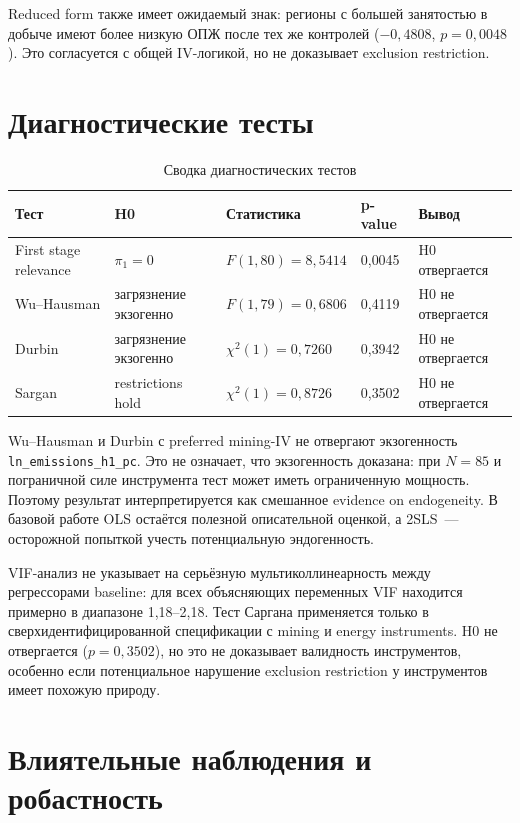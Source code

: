\documentclass[10pt,a4paper]{article}
\begin{document}
Reduced form также имеет ожидаемый знак: регионы с большей занятостью в добыче имеют более низкую ОПЖ после тех же контролей ($-0{,}4808$, $p=0{,}0048$). Это согласуется с общей IV-логикой, но не доказывает exclusion restriction.

\section{Диагностические тесты}

\begin{table}[H]
\centering
\caption{Сводка диагностических тестов}
\label{tab:tests}
\small
\setlength{\tabcolsep}{3pt}
\begin{tabular}{p{}p{}p{}p{}p{}}
\toprule
\textbf{Тест} & \textbf{H0} & \textbf{Статистика} & \textbf{p-value} & \textbf{Вывод} \\
\midrule
First stage relevance & $\pi_1=0$ & $F(1,80)=8{,}5414$ & 0{,}0045 & H0 отвергается \\
Wu--Hausman & загрязнение экзогенно & $F(1,79)=0{,}6806$ & 0{,}4119 & H0 не отвергается \\
Durbin & загрязнение экзогенно & $\chi^2(1)=0{,}7260$ & 0{,}3942 & H0 не отвергается \\
Sargan & restrictions hold & $\chi^2(1)=0{,}8726$ & 0{,}3502 & H0 не отвергается \\
\bottomrule
\end{tabular}
\end{table}

Wu--Hausman и Durbin с preferred mining-IV не отвергают экзогенность \texttt{ln\_emissions\_h1\_pc}. Это не означает, что экзогенность доказана: при $N=85$ и пограничной силе инструмента тест может иметь ограниченную мощность. Поэтому результат интерпретируется как смешанное evidence on endogeneity. В базовой работе OLS остаётся полезной описательной оценкой, а 2SLS~--- осторожной попыткой учесть потенциальную эндогенность.

VIF-анализ не указывает на серьёзную мультиколлинеарность между регрессорами baseline: для всех объясняющих переменных VIF находится примерно в диапазоне 1{,}18--2{,}18. Тест Саргана применяется только в сверхидентифицированной спецификации с mining и energy instruments. H0 не отвергается ($p=0{,}3502$), но это не доказывает валидность инструментов, особенно если потенциальное нарушение exclusion restriction у инструментов имеет похожую природу.

\section{Влиятельные наблюдения и робастность}
\end{document}
